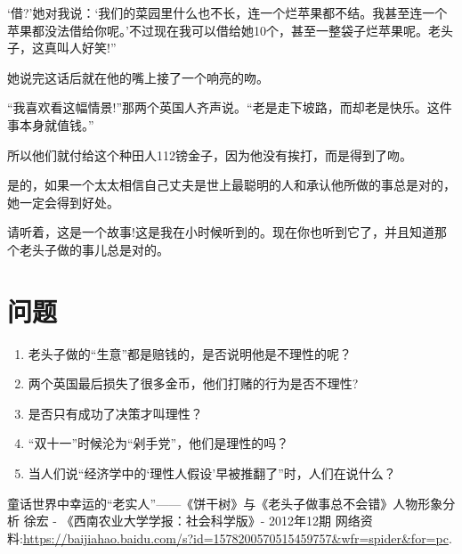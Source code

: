 \documentclass[10pt, a4paper]{ctexart} %
\begin{document}
‘借?’她对我说：‘我们的菜园里什么也不长，连一个烂苹果都不结。我甚至连一个苹果都没法借给你呢。’不过现在我可以借给她10个，甚至一整袋子烂苹果呢。老头子，这真叫人好笑!”

她说完这话后就在他的嘴上接了一个响亮的吻。

“我喜欢看这幅情景!”那两个英国人齐声说。“老是走下坡路，而却老是快乐。这件事本身就值钱。”

所以他们就付给这个种田人112镑金子，因为他没有挨打，而是得到了吻。

是的，如果一个太太相信自己丈夫是世上最聪明的人和承认他所做的事总是对的，她一定会得到好处。

请听着，这是一个故事!这是我在小时候听到的。现在你也听到它了，并且知道那个老头子做的事儿总是对的。

\section*{问题}
\begin{enumerate}
	\item 老头子做的“生意”都是赔钱的，是否说明他是不理性的呢？
	\item 两个英国最后损失了很多金币，他们打赌的行为是否不理性?
	\item 是否只有成功了决策才叫理性？
	\item “双十一”时候沦为“剁手党”，他们是理性的吗？
	\item 当人们说“经济学中的‘理性人假设’早被推翻了”时，人们在说什么？
\end{enumerate}




\small
\begin{thebibliography}{99}
	\setlength{\parskip}{0pt} %
	 童话世界中幸运的“老实人”——《饼干树》与《老头子做事总不会错》人物形象分析 徐宏 - 《西南农业大学学报：社会科学版》- 2012年12期
	 网络资料:\url{https://baijiahao.baidu.com/s?id=1578200570515459757&wfr=spider&for=pc}.
	\end {thebibliography}
\end{document}
